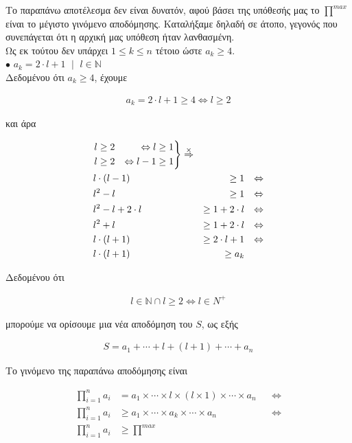 \documentclass[12pt]{article}
\newcommand{\N}{\mathbb{N}}
\newcommand{\margin}{\hspace{4pt}}
\newcommand{\centered}[1]{\begin{align*}#1\end{align*}}
\newenvironment{rcases}
	{\left.\begin{aligned}}
	{\end{aligned}\right\rbrace}
\begin{document}
Το παραπάνω αποτέλεσμα δεν είναι δυνατόν, αφού βάσει της υπόθεσής μας το \( \stackrel{max}{\prod} \) είναι το μέγιστο γινόμενο αποδόμησης. Καταλήξαμε δηλαδή σε άτοπο, γεγονός που συνεπάγεται ότι η αρχική μας υπόθεση ήταν λανθασμένη. \\

Ως εκ τούτου δεν υπάρχει \( 1 \leq k \leq n \) τέτοιο ώστε \( a_k \geq 4 \). \\

\( \bullet \) \( a_k = 2 \cdot l + 1 \margin \mid \margin l \in \N \) \\

Δεδομένου ότι \( a_k \geq 4 \), έχουμε

\centered{a_k = 2 \cdot l + 1 \geq 4 \Leftrightarrow l \geq 2}

και άρα

\begin{align*}
    &\begin{rcases}
        l & \geq 2 & \Leftrightarrow l & \geq 1 \\
        l & \geq 2 & \Leftrightarrow l - 1 & \geq 1 \\
    \end{rcases}
    \stackrel{\times}{\Rightarrow} \\
    &l \cdot (l - 1) & \geq 1 && \Leftrightarrow \\
    &l^2 - l & \geq 1 && \Leftrightarrow \\
    &l^2 - l + 2 \cdot l & \geq 1 + 2 \cdot l && \Leftrightarrow \\
    &l^2 + l & \geq 1 + 2 \cdot l && \Leftrightarrow \\
    &l \cdot (l + 1) & \geq 2 \cdot l + 1 && \Leftrightarrow \\
    &l \cdot (l + 1) & \geq a_k
\end{align*}

Δεδομένου ότι

\centered{l \in \N \cap l \geq 2 \Leftrightarrow l \in N^+}

μπορούμε να ορίσουμε μια νέα αποδόμηση του \( S \), ως εξής

\centered{S = a_1 + \dotsb + l + (l + 1) + \dotsb + a_n}

Το γινόμενο της παραπάνω αποδόμησης είναι

\begin{align*}
    \prod_{i = 1}^{n} a_i & = a_1 \times \dotsb \times l \times (l \times 1) \times \dotsb \times a_n && \Leftrightarrow \\
    \prod_{i = 1}^{n} a_i & \geq a_1 \times \dotsb \times a_k \times \dotsb \times a_n && \Leftrightarrow \\
    \prod_{i = 1}^{n} a_i & \geq \stackrel{max}{\prod}
\end{align*}
\end{document}
